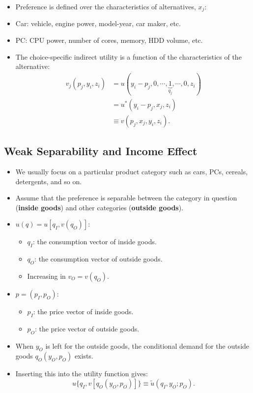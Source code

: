 \documentclass[
]{book}
\providecommand{\tightlist}{%
  \setlength{\itemsep}{0pt}\setlength{\parskip}{0pt}}
\begin{document}
\begin{itemize}
\item
  Preference is defined over the characteristics of alternatives, \(x_j\):
\item
  Car: vehicle, engine power, model-year, car maker, etc.
\item
  PC: CPU power, number of cores, memory, HDD volume, etc.
\item
  The choice-specific indirect utility is a function of the characteristics of the alternative:
  \begin{equation}
  \begin{split}
  v_j(p_j, y_i, z_i) &= u(y_i - p_j, 0, \cdots, \underbrace{1}_{q_j}, \cdots, 0, z_i)\\
  &= u^*(y_i - p_j, x_j, z_i)\\
  &\equiv v(p_j, x_j, y_i, z_i).
  \end{split}
  \end{equation}
\end{itemize}

\hypertarget{weak-separability-and-income-effect}{%
\subsection{Weak Separability and Income Effect}\label{weak-separability-and-income-effect}}

\begin{itemize}
\tightlist
\item
  We usually focus on a particular product category such as cars, PCs, cereals, detergents, and so on.
\item
  Assume that the preference is separable between the category in question (\textbf{inside goods}) and other categories (\textbf{outside goods}).
\item
  \(u(q) = u[q_I, v(q_O)]\):

  \begin{itemize}
  \tightlist
  \item
    \(q_I\): the consumption vector of inside goods.
  \item
    \(q_O\): the consumption vector of outside goods.
  \item
    Increasing in \(v_O = v(q_O)\).
  \end{itemize}
\item
  \(p = (p_I, p_O)\):

  \begin{itemize}
  \tightlist
  \item
    \(p_I\): the price vector of inside goods.
  \item
    \(p_O\): the price vector of outside goods.
  \end{itemize}
\item
  When \(y_O\) is left for the outside goods, the conditional demand for the outside goods \(q_O(y_O, p_O)\) exists.
\item
  Inserting this into the utility function gives:
  \begin{equation}
  u\{q_I, v[q_O(y_O, p_O)]\} \equiv \tilde{u}(q_I, y_O; p_O).
  \end{equation}
\end{itemize}
\end{document}
